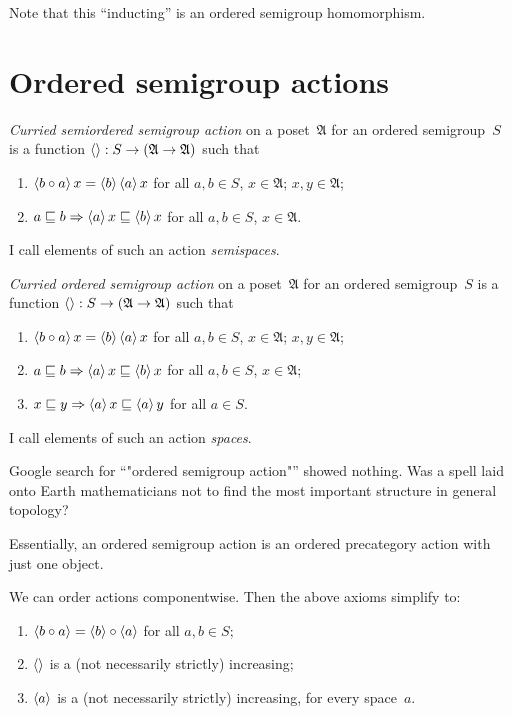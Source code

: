 Note that this ``inducting'' is an ordered semigroup homomorphism.

\chapter{Ordered semigroup actions}

\begin{defn}
\emph{Curried semiordered semigroup action} on a poset~$\mathfrak{A}$ for an ordered semigroup~$S$ is a function $\left\langle \right\rangle:S\to(\mathfrak{A}\to\mathfrak{A})$ such that
\begin{enumerate}
\item $\left\langle b\circ a\right\rangle x = \left\langle b\right\rangle\left\langle a\right\rangle x$ for all $a,b\in S$, $x\in\mathfrak{A}$;
$x,y\in\mathfrak{A}$;
\item $a\sqsubseteq b\Rightarrow\left\langle a\right\rangle x\sqsubseteq \left\langle b\right\rangle x$ for all $a,b\in S$, $x\in\mathfrak{A}$.
\end{enumerate}
I call elements of such an action \emph{semispaces}.
\end{defn}

\begin{defn}
\emph{Curried ordered semigroup action} on a poset~$\mathfrak{A}$ for an ordered semigroup~$S$ is a function $\left\langle \right\rangle:S\to(\mathfrak{A}\to\mathfrak{A})$ such that
\begin{enumerate}
\item $\left\langle b\circ a\right\rangle x = \left\langle b\right\rangle\left\langle a\right\rangle x$ for all $a,b\in S$, $x\in\mathfrak{A}$;
$x,y\in\mathfrak{A}$;
\item $a\sqsubseteq b\Rightarrow\left\langle a\right\rangle x\sqsubseteq \left\langle b\right\rangle x$ for all $a,b\in S$, $x\in\mathfrak{A}$;
\item $x\sqsubseteq y\Rightarrow\left\langle a\right\rangle x\sqsubseteq \left\langle a\right\rangle y$ for all $a\in S$.
\end{enumerate}
I call elements of such an action \emph{spaces}.
\end{defn}

\begin{rem}
Google search for ``"ordered semigroup action"'' showed nothing. Was a spell laid onto Earth mathematicians not to find the most important structure in general topology?
\end{rem}

Essentially, an ordered semigroup action is an ordered precategory action with just one object.

We can order actions componentwise. Then the above axioms simplify to:
\begin{enumerate}
\item $\left\langle b\circ a\right\rangle = \left\langle b\right\rangle\circ\left\langle a\right\rangle$ for all $a,b\in S$;
\item $\left\langle \right\rangle$ is a (not necessarily strictly) increasing;
\item $\left\langle a\right\rangle$ is a (not necessarily strictly) increasing, for every space~$a$.
\end{enumerate}

